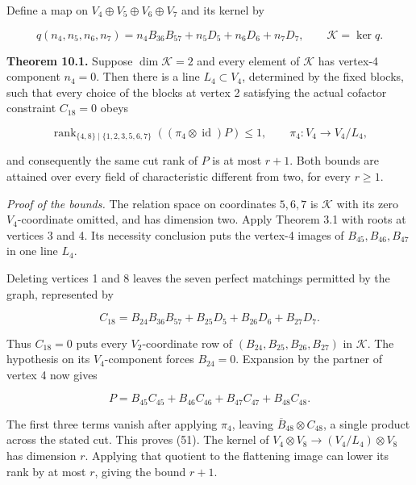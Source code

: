 \documentclass[11pt]{article}
\begin{document}
Define a map on $V_4\oplus V_5\oplus V_6\oplus V_7$ and its kernel by


\nopagebreak[4]

\begin{equation}
q(n_4,n_5,n_6,n_7)=n_4B_{36}B_{57}+n_5D_5+n_6D_6+n_7D_7,
\qquad \mathcal K=\ker q.
\tag{50}
\end{equation}

\textbf{Theorem 10.1.} Suppose $\dim\mathcal K=2$ and every element of $\mathcal K$ has vertex-4 component $n_4=0$. Then there is a line $L_4\subset V_4$, determined by the fixed blocks, such that every choice of the blocks at vertex 2 satisfying the actual cofactor constraint $C_{18}=0$ obeys


\nopagebreak[4]

\begin{equation}
\operatorname{rank}_{\{4,8\}\mid\{1,2,3,5,6,7\}}
((\pi_4\otimes\operatorname{id})P)\leq1,
\qquad \pi_4:V_4\to V_4/L_4,
\tag{51}
\end{equation}

and consequently the same cut rank of $P$ is at most $r+1$. Both bounds are attained over every field of characteristic different from two, for every $r\geq1$.


\emph{Proof of the bounds.} The relation space on coordinates $5,6,7$ is $\mathcal K$ with its zero $V_4$-coordinate omitted, and has dimension two. Apply Theorem 3.1 with roots at vertices 3 and 4. Its necessity conclusion puts the vertex-4 images of $B_{45},B_{46},B_{47}$ in one line $L_4$.


Deleting vertices 1 and 8 leaves the seven perfect matchings permitted by the graph, represented by


\nopagebreak[4]

\begin{equation}
C_{18}=B_{24}B_{36}B_{57}+B_{25}D_5+B_{26}D_6+B_{27}D_7.
\tag{52}
\end{equation}

Thus $C_{18}=0$ puts every $V_2$-coordinate row of $(B_{24},B_{25},B_{26},B_{27})$ in $\mathcal K$. The hypothesis on its $V_4$-component forces $B_{24}=0$. Expansion by the partner of vertex 4 now gives


\nopagebreak[4]

\begin{equation}
P=B_{45}C_{45}+B_{46}C_{46}+B_{47}C_{47}+B_{48}C_{48}.
\tag{53}
\end{equation}

The first three terms vanish after applying $\pi_4$, leaving $\overline B_{48}\otimes C_{48}$, a single product across the stated cut. This proves (51). The kernel of $V_4\otimes V_8\to(V_4/L_4)\otimes V_8$ has dimension $r$. Applying that quotient to the flattening image can lower its rank by at most $r$, giving the bound $r+1$.
\end{document}
